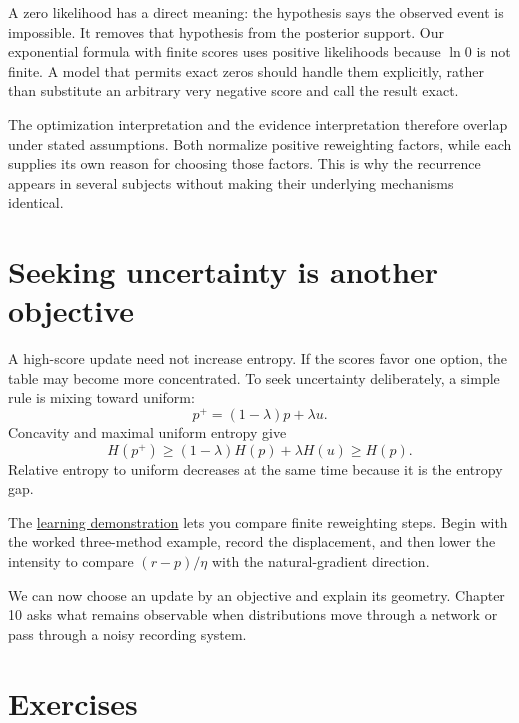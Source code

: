 \documentclass[11pt,oneside,openany]{book}
\theoremstyle{definition}
\theoremstyle{remark}
\numberwithin{equation}{chapter}
\begin{document}
A zero likelihood has a direct meaning: the hypothesis says the observed event is impossible. It removes that hypothesis from the posterior support. Our exponential formula with finite scores uses positive likelihoods because \(\ln0\) is not finite. A model that permits exact zeros should handle them explicitly, rather than substitute an arbitrary very negative score and call the result exact.

The optimization interpretation and the evidence interpretation therefore overlap under stated assumptions. Both normalize positive reweighting factors, while each supplies its own reason for choosing those factors. This is why the recurrence appears in several subjects without making their underlying mechanisms identical.

\section{Seeking uncertainty is another objective}\label{ch09-seeking-uncertainty-is-another-objective}

A high-score update need not increase entropy. If the scores favor one option, the table may become more concentrated. To seek uncertainty deliberately, a simple rule is mixing toward uniform: \[p^+=(1-\lambda)p+\lambda u.\] Concavity and maximal uniform entropy give \[H(p^+)\geq(1-\lambda)H(p)+\lambda H(u)\geq H(p).\] Relative entropy to uniform decreases at the same time because it is the entropy gap.

The \href{https://bobovski66.github.io/IntroDiscreteInfoGeom/demos/week09.html}{learning demonstration} lets you compare finite reweighting steps. Begin with the worked three-method example, record the displacement, and then lower the intensity to compare \((r-p)/\eta\) with the natural-gradient direction.

We can now choose an update by an objective and explain its geometry. Chapter 10 asks what remains observable when distributions move through a network or pass through a noisy recording system.

\section{Exercises}\label{ch09-exercises}
\end{document}
